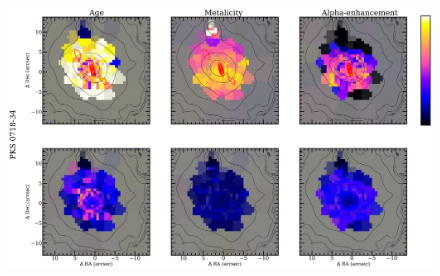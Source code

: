 		\begin{figure}
			\centering
			\includegraphics[height=0.31\textheight]{chapter4/vimos/pop4.png}
		\end{figure}


